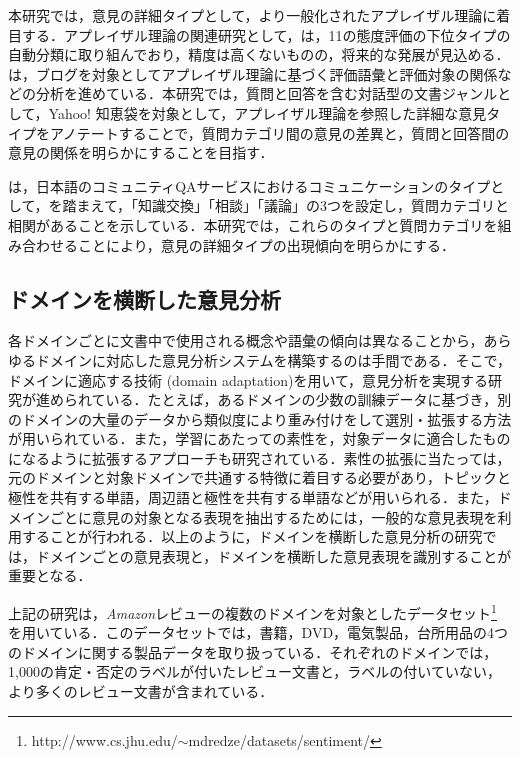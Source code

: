 \documentclass[japanese]{jnlp_1.4}
\begin{document}
本研究では，意見の詳細タイプとして，より一般化されたアプレイザル理論\cite{martin2005}に着目する．アプレイザル理論の関連研究として，は，11の態度評価の下位タイプの自動分類に取り組んでおり，精度は高くないものの，将来的な発展が見込める．は，ブログを対象としてアプレイザル理論に基づく評価語彙と評価対象の関係などの分析を進めている．本研究では，質問と回答を含む対話型の文書ジャンルとして，Yahoo! 知恵袋を対象として，アプレイザル理論を参照した詳細な意見タイプをアノテートすることで，質問カテゴリ間の意見の差異と，質問と回答間の意見の関係を明らかにすることを目指す．

は，日本語のコミュニティQAサービスにおけるコミュニケーションのタイプとして，を踏まえて，「知識交換」「相談」「議論」の3つを設定し，質問カテゴリと相関があることを示している．本研究では，これらのタイプと質問カテゴリを組み合わせることにより，意見の詳細タイプの出現傾向を明らかにする．


\subsection{ドメインを横断した意見分析}
\label{subsec:domain}

各ドメインごとに文書中で使用される概念や語彙の傾向は異なることから，あらゆるドメインに対応した意見分析システムを構築するのは手間である．そこで，ドメインに適応する技術 (domain adaptation)\cite{soggard2013domain}を用いて，意見分析を実現する研究\cite{pono2012emnlp,he2011acl,bolle2011acl,li2012acl}が進められている．たとえば，あるドメインの少数の訓練データに基づき，別のドメインの大量のデータから類似度により重み付けをして選別・拡張する方法\cite{pono2012emnlp}が用いられている．また，学習にあたっての素性を，対象データに適合したものになるように拡張するアプローチ\cite{he2011acl,bolle2011acl}も研究されている．素性の拡張に当たっては，元のドメインと対象ドメインで共通する特徴に着目する必要があり，トピックと極性を共有する単語\cite{pono2012emnlp}，周辺語と極性を共有する単語\cite{bolle2011acl}などが用いられる．また，ドメインごとに意見の対象となる表現を抽出するためには，一般的な意見表現を利用することが行われる\cite{li2012acl}．以上のように，ドメインを横断した意見分析の研究では，ドメインごとの意見表現と，ドメインを横断した意見表現を識別することが重要となる．

上記の研究は，{\it Amazon}レビューの複数のドメインを対象としたデータセット\footnote{http://www.cs.jhu.edu/$\sim$mdredze/datasets/sentiment/} を用いている\cite{blit2007acl}．このデータセットでは，書籍，DVD，電気製品，台所用品の4つのドメインに関する製品データを取り扱っている．それぞれのドメインでは，1,000の肯定・否定のラベルが付いたレビュー文書と，ラベルの付いていない，より多くのレビュー文書が含まれている．
\end{document}
